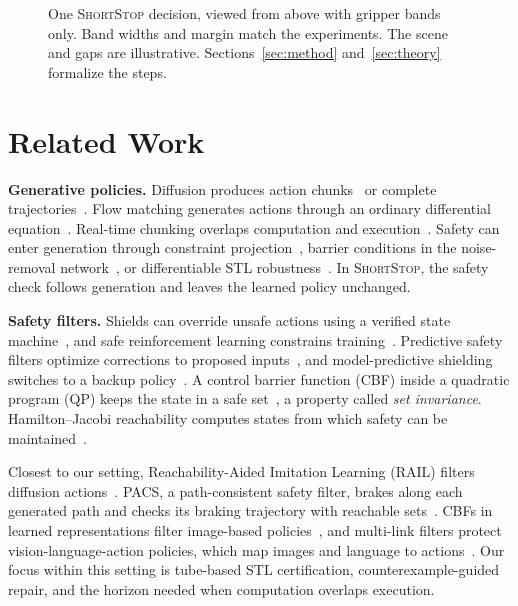 \documentclass[runningheads]{llncs}
\newcommand{\sys}{\textsc{ShortStop}}
\begin{document}
\begin{figure}[t]
\centering

\caption{One \sys{} decision, viewed from above with gripper bands only.
Band widths and margin match the experiments. The scene and gaps are
illustrative. Sections~\ref{sec:method} and~\ref{sec:theory} formalize the steps.}
\label{fig:loop}
\end{figure}

\section{Related Work}\label{sec:related}

\textbf{Generative policies.} Diffusion produces action
chunks~\cite{chi2023diffusion,reuss2024mdt} or complete
trajectories~\cite{janner2022planning}. Flow matching generates actions
through an ordinary differential equation~\cite{lipman2023flow}.
Real-time chunking overlaps computation and execution~\cite{black2025rtc}.
Safety can enter generation through constraint
projection~\cite{power2023sampling}, barrier conditions in the
noise-removal network~\cite{xiao2023safediffuser}, or differentiable STL
robustness~\cite{meng2025diverse}. In \sys{}, the safety check follows
generation and leaves the learned policy unchanged.

\textbf{Safety filters.} Shields can override unsafe actions using a
verified state machine~\cite{alshiekh2018shielding}, and safe reinforcement
learning constrains training~\cite{brunke2022safe}. Predictive safety
filters optimize corrections to proposed inputs~\cite{wabersich2021predictive},
and model-predictive shielding switches to a backup
policy~\cite{bastani2021mps}. A control barrier function (CBF) inside a quadratic program (QP) keeps the
state in a safe set~\cite{ames2017cbfqp}, a property called \emph{set
invariance}. Hamilton--Jacobi reachability computes states
from which safety can be maintained~\cite{bansal2017hj}.

Closest to our setting, Reachability-Aided Imitation Learning (RAIL)
filters diffusion actions~\cite{jung2024rail}. PACS, a path-consistent
safety filter, brakes along each generated path and checks its braking
trajectory with reachable sets~\cite{roemer2026pacs}. CBFs in learned
representations filter image-based policies~\cite{nakamura2025latentcbf}, and
multi-link filters protect vision-language-action policies, which map
images and language to actions~\cite{agarwal2026multilink}. Our focus within this setting is tube-based STL certification,
counterexample-guided repair, and the horizon needed when computation
overlaps execution.
\end{document}
